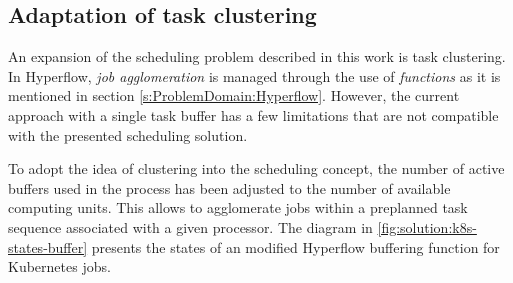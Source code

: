 \subsection{Adaptation of task clustering}\label{s:SchedHyperflow:Agglomeration}



An expansion of the scheduling problem described in this work is task clustering.
In Hyperflow, \emph{job agglomeration} is managed through the use of \emph{functions} as it is mentioned in section \ref{s:ProblemDomain:Hyperflow}.
However, the current approach with a single task buffer has a few limitations that are not compatible with the presented scheduling solution.







To adopt the idea of clustering into the scheduling concept, the number of active buffers used in the process has been adjusted to the number of available computing units.
This allows to agglomerate jobs within a preplanned task sequence associated with a given processor.
The diagram in \cref{fig:solution:k8s-states-buffer} presents the states of an modified Hyperflow buffering function for Kubernetes jobs. 


